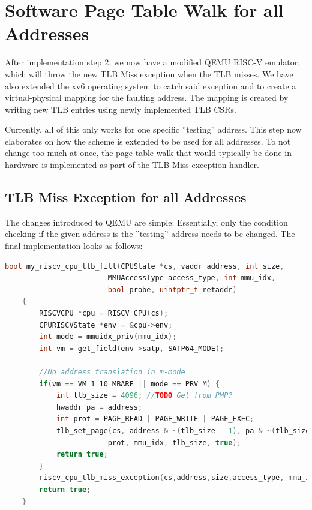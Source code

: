 \section{Software Page Table Walk for all Addresses}
After implementation step 2, we now have a modified QEMU RISC-V emulator, which will throw the new
TLB Miss exception when the TLB misses.
We have also extended the xv6 operating system to catch said exception and to create a virtual-physical
mapping for the faulting address.
The mapping is created by writing new TLB entries using newly implemented TLB CSRs.

Currently, all of this only works for one specific ''testing'' address. This step now elaborates on
how the scheme is extended to be used for all addresses.
To not change too much at once, the page table walk that would typically be done in hardware is
implemented as part of the TLB Miss exception handler.

\subsection{TLB Miss Exception for all Addresses}
The changes introduced to QEMU are simple: Essentially, only the condition checking if the given address is
the ''testing'' address needs to be changed.
The final implementation looks as follows:

\begin{lstlisting}[language=c,float=h!,
    caption={},
    label={lst:updatedTLBFill}]
    bool my_riscv_cpu_tlb_fill(CPUState *cs, vaddr address, int size,
                        MMUAccessType access_type, int mmu_idx,
                        bool probe, uintptr_t retaddr)
    {
        RISCVCPU *cpu = RISCV_CPU(cs);
        CPURISCVState *env = &cpu->env;
        int mode = mmuidx_priv(mmu_idx);
        int vm = get_field(env->satp, SATP64_MODE);

        //No address translation in m-mode
        if(vm == VM_1_10_MBARE || mode == PRV_M) {
            int tlb_size = 4096; //TODO Get from PMP?
            hwaddr pa = address;
            int prot = PAGE_READ | PAGE_WRITE | PAGE_EXEC;
            tlb_set_page(cs, address & ~(tlb_size - 1), pa & ~(tlb_size - 1),
                        prot, mmu_idx, tlb_size, true);
            return true;
        }
        riscv_cpu_tlb_miss_exception(cs,address,size,access_type, mmu_idx, probe, retaddr);
        return true;
    }
\end{lstlisting}


